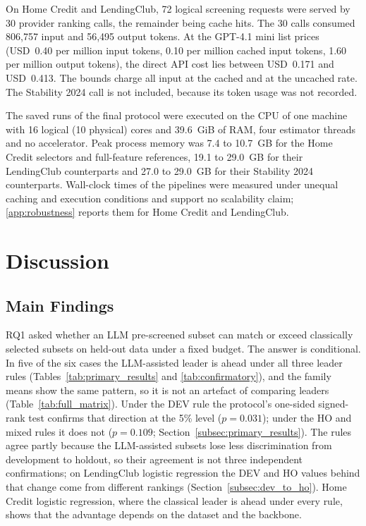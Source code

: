 \documentclass[final,5p,twocolumn]{elsarticle}
\begin{document}
On Home Credit and LendingClub, 72 logical screening requests were served by 30 provider ranking calls, the remainder being cache hits. The 30 calls consumed 806,757 input and 56,495 output tokens. At the GPT-4.1 mini list prices (USD~0.40 per million input tokens, 0.10 per million cached input tokens, 1.60 per million output tokens), the direct API cost lies between USD~0.171 and USD~0.413. The bounds charge all input at the cached and at the uncached rate. The Stability 2024 call is not included, because its token usage was not recorded.

The saved runs of the final protocol were executed on the CPU of one machine with 16 logical (10 physical) cores and 39.6~GiB of RAM, four estimator threads and no accelerator. Peak process memory was 7.4 to 10.7~GB for the Home Credit selectors and full-feature references, 19.1 to 29.0~GB for their LendingClub counterparts and 27.0 to 29.0~GB for their Stability 2024 counterparts. Wall-clock times of the pipelines were measured under unequal caching and execution conditions and support no scalability claim; \ref{app:robustness} reports them for Home Credit and LendingClub.


\section{Discussion}
\label{sec:discussion}

\subsection{Main Findings}
\label{subsec:main_findings}

RQ1 asked whether an LLM pre-screened subset can match or exceed classically selected subsets on held-out data under a fixed budget. The answer is conditional. In five of the six cases the LLM-assisted leader is ahead under all three leader rules (Tables~\ref{tab:primary_results} and \ref{tab:confirmatory}), and the family means show the same pattern, so it is not an artefact of comparing leaders (Table~\ref{tab:full_matrix}). Under the DEV rule the protocol's one-sided signed-rank test confirms that direction at the 5\% level ($p=0.031$); under the HO and mixed rules it does not ($p=0.109$; Section~\ref{subsec:primary_results}). The rules agree partly because the LLM-assisted subsets lose less discrimination from development to holdout, so their agreement is not three independent confirmations; on LendingClub logistic regression the DEV and HO values behind that change come from different rankings (Section~\ref{subsec:dev_to_ho}). Home Credit logistic regression, where the classical leader is ahead under every rule, shows that the advantage depends on the dataset and the backbone.
\end{document}
